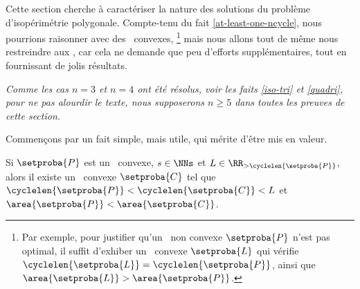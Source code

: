 Cette section cherche à caractériser la nature des solutions du problème d’isopérimétrie polygonale.
Compte-tenu du fait \ref{at-least-one-ncycle}, nous pourrions raisonner avec des \ncycles\ convexes,%
\footnote{
    Par exemple, pour justifier qu'un \ngone\ non convexe $\setproba{P}$ n'est pas optimal, il suffit d'exhiber un \ncycle\ convexe $\setproba{L}$ qui vérifie
$\cyclelen{\setproba{L}} = \cyclelen{\setproba{P}}$,
    ainsi que
    $\area{\setproba{L}} > \area{\setproba{P}}$.
}
mais nous allons tout de même nous restreindre aux \ngones, car cela ne demande que peu d'efforts supplémentaires, tout en fournissant de jolis résultats.

\begin{tcolorbox}
    \itshape\small
    Comme les cas $n = 3$ et $n = 4$ ont été résolus, voir les faits \ref{iso-tri} et \ref{quadri}, pour ne pas alourdir le texte, nous supposerons $n \geq 5$ dans toutes les preuves de cette section.
\end{tcolorbox}




Commençons par un fait simple, mais utile, qui mérite d'être mis en valeur.


\begin{fact} \label{bigger-convex}
    Si $\setproba{P}$ est un \ngone\ convexe, $s \in \NNs$ et $L \in \RR_{>\cyclelen{\setproba{P}}}$,
    alors il existe un \ convexe $\setproba{C}$ tel que
    $\cyclelen{\setproba{P}} < \cyclelen{\setproba{C}} < L$
    et
    $\area{\setproba{P}} < \area{\setproba{C}}$.
\end{fact}


